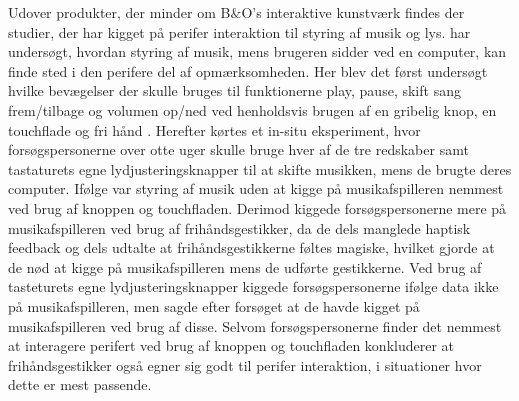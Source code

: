  Udover produkter, der minder om B$\&$O's interaktive kunstværk findes der studier, der har kigget på perifer interaktion til styring af musik og lys. \textcite{PDF:FacilitatingPIDesignAndEvaluation} har undersøgt, hvordan styring af musik, mens brugeren sidder ved en computer, kan finde sted i den perifere del af opmærksomheden. Her blev det først undersøgt hvilke bevægelser der skulle bruges til funktionerne play, pause, skift sang frem/tilbage og volumen op/ned ved henholdsvis brugen af en gribelig knop, en touchflade og fri hånd \parencite[ss. 165-166]{PDF:FacilitatingPIDesignAndEvaluation}. Herefter kørtes et in-situ eksperiment, hvor forsøgspersonerne over otte uger skulle bruge hver af de tre redskaber samt tastaturets egne lydjusteringsknapper til at skifte musikken, mens de brugte deres computer. Ifølge \textcite[ss. 172-173]{PDF:FacilitatingPIDesignAndEvaluation} var styring af musik uden at kigge på musikafspilleren nemmest ved brug af knoppen og touchfladen. Derimod kiggede forsøgspersonerne mere på musikafspilleren ved brug af frihåndsgestikker, da de dels manglede haptisk feedback og dels udtalte at frihåndsgestikkerne føltes magiske, hvilket gjorde at de nød at kigge på musikafspilleren mens de udførte gestikkerne. Ved brug af tasteturets egne lydjusteringsknapper kiggede forsøgspersonerne ifølge data ikke på musikafspilleren, men sagde efter forsøget at de havde kigget på musikafspilleren ved brug af disse. Selvom forsøgspersonerne finder det nemmest at interagere perifert ved brug af knoppen og touchfladen konkluderer \textcite[s. 177]{PDF:FacilitatingPIDesignAndEvaluation} at frihåndsgestikker også egner sig godt til perifer interaktion, i situationer hvor dette er mest passende.
 
